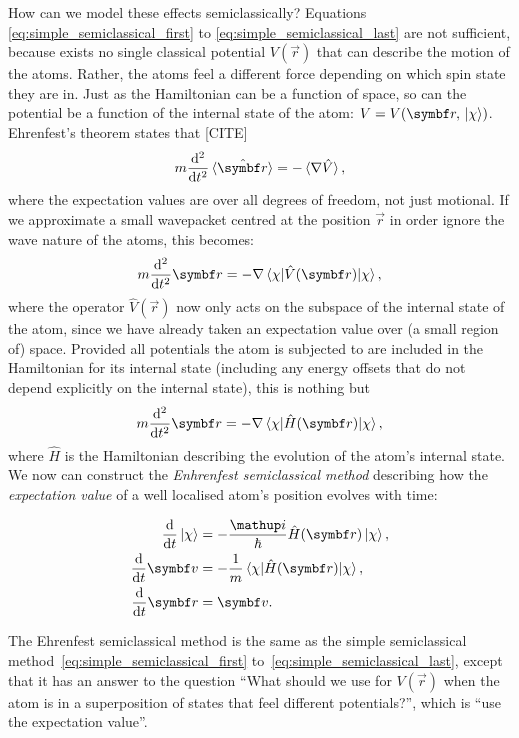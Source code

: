 How can we model these effects semiclassically? Equations \eqref{eq:simple_semiclassical_first} to \eqref{eq:simple_semiclassical_last} are not sufficient, because exists no single classical potential $V(\vec r)$ that can describe the motion of the atoms. Rather, the atoms feel a different force depending on which spin state they are in. Just as the Hamiltonian can be a function of space, so can the potential be a function of the internal state of the atom: $V = V(\vec{r}, \ket\chi)$. Ehrenfest's theorem states that [CITE]
\begin{align}
m\dv[2]{t}\ev{\hat{\vec r}} = - \ev{\nabla \hat V},
\end{align}
where the expectation values are over all degrees of freedom, not just motional. If we approximate a small wavepacket centred at the position $\vec r$ in order ignore the wave nature of the atoms, this becomes:
\begin{align}
m\dv[2]{t} \vec r = - \nabla \matrixel{\chi}{\hat V(\vec r)}{\chi},
\end{align}
where the operator $\hat V(\vec r)$ now only acts on the subspace of the internal state of the atom, since we have already taken an expectation value over (a small region of) space. Provided all potentials the atom is subjected to are included in the Hamiltonian for its internal state (including any energy offsets that do not
depend explicitly on the internal state), this is nothing but
\begin{align}
m\dv[2]{t} \vec r = - \nabla \matrixel{\chi}{\hat H(\vec r)}{\chi},
\end{align}
where $\hat H$ is the Hamiltonian describing the evolution of the atom's internal state. We now can construct the \emph{Enhrenfest semiclassical method} describing how the \emph{expectation value} of a well localised atom's position evolves with time:

\begin{align}\label{eq:ehrenfest_semiclassical_first}
\dv{t}\ket\chi &= -\frac\ii\hbar \hat H(\vec r)\ket\chi,\\
\dv{t}\vec v &= -\frac1m\matrixel{\chi}{\hat H(\vec r)}{\chi},\\
\dv{t}\vec r &= \vec v\label{eq:ehrenfest_semiclassical_last}.
\end{align}

The Ehrenfest semiclassical method is the same as the simple semiclassical method~\eqref{eq:simple_semiclassical_first} to~\eqref{eq:simple_semiclassical_last}, except that it has an answer to the question ``What should we use for $V(\vec r)$ when the atom is in a superposition of states that feel different potentials?'', which is ``use the expectation value''. 

